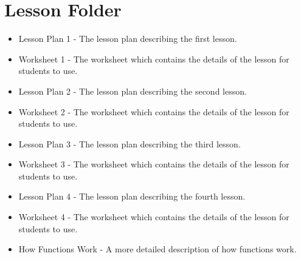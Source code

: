\documentclass{geocraft-worksheet}
\begin{document}
\section*{Lesson Folder}
\begin{itemize}
\item Lesson Plan 1 - The lesson plan describing the first lesson.
\item Worksheet 1 - The worksheet which contains the details of the
  lesson for students to use.
\item Lesson Plan 2 - The lesson plan describing the second lesson.
\item Worksheet 2 - The worksheet which contains the details of the
  lesson for students to use.
\item Lesson Plan 3 - The lesson plan describing the third lesson.
\item Worksheet 3 - The worksheet which contains the details of the
  lesson for students to use.
\item Lesson Plan 4 - The lesson plan describing the fourth lesson.
\item Worksheet 4 - The worksheet which contains the details of the
  lesson for students to use.
\item How Functions Work - A more detailed description of how
  functions work.
\end{itemize}
\end{document}
